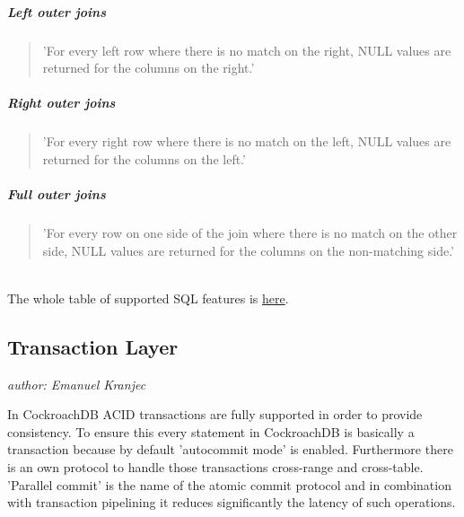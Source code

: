 \subparagraph{Left outer joins}
\begin{quote}
'For every left row where there is no match on the right, NULL values are returned for the columns on the right.'\cite{cockroach-sql-joins}
\end{quote}

\subparagraph{Right outer joins}
\begin{quote}
'For every right row where there is no match on the left, NULL values are returned for the columns on the left.'\cite{cockroach-sql-joins}
\end{quote}

\subparagraph{Full outer joins}
\begin{quote}
'For every row on one side of the join where there is no match on the other side, NULL values are returned for the columns on the non-matching side.'\cite{cockroach-sql-joins}
\end{quote}
\\

The whole table of supported SQL features is \href{https://www.cockroachlabs.com/docs/stable/sql-feature-support.html}{here}\cite{cockroach-sql-feature-support}.

\newpage
\subsection{Transaction Layer}
\emph{author: Emanuel Kranjec}\bigskip

In CockroachDB ACID transactions are fully supported in order to provide consistency. To ensure this every statement in 
CockroachDB is basically a transaction because by default 'autocommit mode' is enabled. Furthermore there is an own protocol
to handle those transactions cross-range and cross-table. 'Parallel commit' is the name of the atomic commit protocol and in
combination with transaction pipelining it reduces significantly the latency of such operations.

